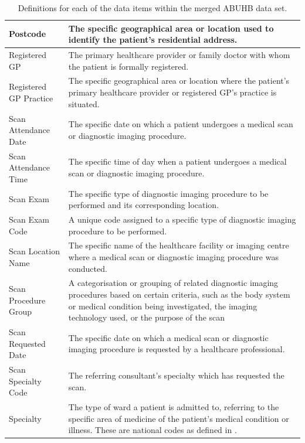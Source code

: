 \documentclass[../thesis.tex]{subfiles}
\begin{document}
\begin{table}[]
{\begin{tabular}{lp{14.5cm}}
       Postcode &  The specific geographical area or location used to identify the patient's residential address.\\\midrule
       Registered GP & The primary healthcare provider or family doctor with whom the patient is formally registered. \\\midrule
       Registered GP Practice & The specific geographical area or location where the patient's primary healthcare provider or registered GP's practice is situated.\\\midrule
       Scan Attendance Date & The specific date on which a patient undergoes a medical scan or diagnostic imaging procedure.\\\midrule
       Scan Attendance Time &  The specific time of day when a patient undergoes a medical scan or diagnostic imaging procedure. \\\midrule
       Scan Exam & The specific type of diagnostic imaging procedure to be performed and its corresponding location.\\\midrule
       Scan Exam Code & A unique code assigned to a specific type of diagnostic imaging procedure to be performed.\\\midrule
       Scan Location Name & The specific name of the healthcare facility or imaging centre where a medical scan or diagnostic imaging procedure was conducted. \\ \midrule
       Scan Procedure Group & A categorisation or grouping of related diagnostic imaging procedures based on certain criteria, such as the body system or medical condition being investigated, the imaging technology used, or the purpose of the scan \\\midrule
       Scan Requested Date & The specific date on which a medical scan or diagnostic imaging procedure is requested by a healthcare professional. \\\midrule    
       Scan Specialty Code & The referring consultant's specialty which has requested the scan. \\\midrule
       Specialty & The type of ward a patient is admitted to, referring to the specific area of medicine of the patient's medical condition or illness. These are national codes as defined in \cite{datadictionary3}.\\ \bottomrule 
    \end{tabular}}
    \caption{Definitions for each of the data items within the merged ABUHB data set.
    }
    \label{tab:Datatypesdef}
\end{table}
\end{document}
